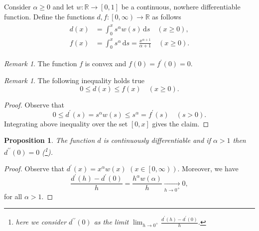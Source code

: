 \documentclass[12pt]{article}
\newcommand{\R}{\mathbb{R}}
\newcommand{\dd}{\,\mathrm{d}}
\newcommand{\dprime}{{\prime\prime}}
\renewcommand{\leq}{\leqslant}
\renewcommand{\geq}{\geqslant}
\newcommand{\convto}[2]{\xrightarrow[#2]{#1}}
\newcommand{\paren}[1]{\! \left(#1 \right)}
\newcommand{\bracket}[1]{\! \left[#1 \right]}
\theoremstyle{plain}
\newtheorem{proposition}[theorem]{Proposition}
\theoremstyle{definition}
\theoremstyle{remark}
\newtheorem{remark}[theorem]{Remark}
\begin{document}
Consider $\alpha \geq 0$ and let $w \colon \R \to \bracket{0, 1}$ be a continuous, nowhere differentiable function.
Define the functions $d, f \colon \left[0, \infty\right) \to \R$ as follows
\begin{align} \label{eq::definition_of_d_and_f}
    \begin{split}
        d\paren{x} & = \int_0^x s^\alpha w\paren{s} \dd s \quad \paren{x \geq 0}, \\
        f\paren{x} & = \int_0^x s^\alpha \dd s = \frac{x^{\alpha+1}}{\alpha+1} \quad \paren{x \geq 0}.
    \end{split}
\end{align}
 
\begin{remark} \label{remark::properties_of_f}
    The function $f$ is convex and $f\paren{0} = f^\prime\paren{0} = 0$.
\end{remark}

\begin{remark} \label{remark::estimate}
    The following inequality holds true 
    \begin{equation*}
        0 \leq d\paren{x} \leq f\paren{x} \quad \paren{x \geq 0}.
     \end{equation*}
\end{remark}
\begin{proof}
    Observe that
    \begin{equation*}
        0 \leq d^\prime\paren{s} = s^\alpha w\paren{s} \leq s^\alpha = f^\prime\paren{s} \quad \paren{s > 0}.
    \end{equation*}
    Integrating above inequality over the set $\bracket{0, x}$ gives the claim.
\end{proof}
 
\begin{proposition} \label{prop::d_is_C1}
    The function $d$ is continuously differentiable and if $\alpha>1$ then $d^\dprime\paren{0} = 0$ (\footnote{here we consider $d^\dprime\paren{0}$ as the limit $\lim_{h \to 0^+} \frac{d^\prime\paren{h} - d^\prime\paren{0}}{h}$.}).
\end{proposition}
\begin{proof}
    Observe that $d^\prime\paren{x} = x^\alpha w\paren{x}$ $\paren{x \in \left[0, \infty\right)}$.
    Moreover, we have
    \begin{equation*}
        \frac{d^\prime\paren{h} - d^\prime\paren{0}}{h} = \frac{h^\alpha w\paren{\alpha}}{h} \convto{}{h \to 0^+} 0,
    \end{equation*}
    for all $\alpha > 1$.
\end{proof}
\end{document}
